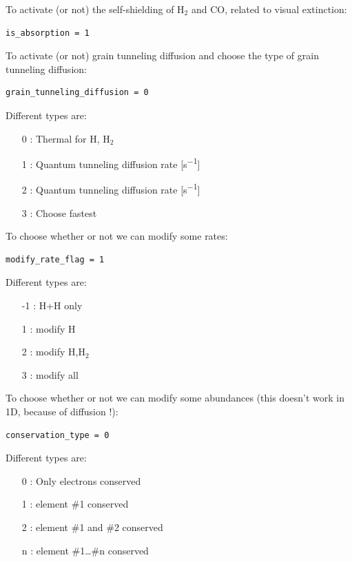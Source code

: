 \documentclass[english,a4paper,twoside]{article}
\newcommand{\molecule}[1]{\ensuremath{\mathrm{#1}}}
\begin{document}
To activate (or not) the self-shielding of $\molecule{H_2}$ and $\molecule{CO}$, related to visual extinction: 
\begin{verbatim}
is_absorption = 1
\end{verbatim}

To activate (or not) grain tunneling diffusion and choose the type of grain tunneling diffusion: 
\begin{verbatim}
grain_tunneling_diffusion = 0
\end{verbatim}

Different types are:
\begin{itemize}
\item[0] : Thermal for H, \molecule{H_2}
\item[1] : Quantum tunneling diffusion rate [\unit{s^{-1}}] \citep{1976RvMP...48..513W}
\item[2] : Quantum tunneling diffusion rate [\unit{s^{-1}}] \citep{1992ApJS...82..167H}
\item[3] : Choose fastest
\end{itemize}

To choose whether or not we can modify some rates:
\begin{verbatim}
modify_rate_flag = 1
\end{verbatim}

Different types are:
\begin{itemize}
\item[-1] : H+H only
\item[1] : modify H
\item[2] : modify H,\molecule{H_2}
\item[3] : modify all
\end{itemize}

To choose whether or not we can modify some abundances (this doesn't work in 1D, because of diffusion !):
\begin{verbatim}
conservation_type = 0
\end{verbatim}

Different types are:
\begin{itemize}
\item[0] : Only electrons conserved
\item[1] : element \#1 conserved
\item[2] : element \#1 and \#2 conserved
\item[n] : element \#1\dots\#n conserved
\end{itemize}
\end{document}
